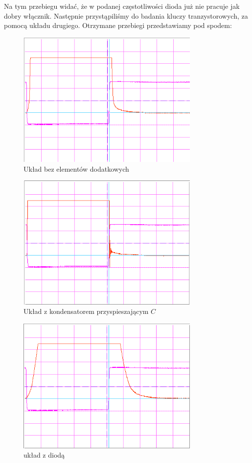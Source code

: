 \documentclass[a4paper,11pt]{article}
\begin{document}
Na tym przebiegu widać, że w podanej częstotliwości dioda już nie pracuje jak dobry włącznik.
\newline
\newline
Następnie przystąpiliśmy do badania kluczy tranzystorowych, za pomocą układu drugiego. 
Otrzymane przebiegi przedstawiamy pod spodem: 
\begin{figure} [H]
  \begin{center}
    \includegraphics[width = 9cm]{../Obrazki_i_tekst/obrobione/II1ciety.png}
    \caption{Układ bez elementów dodatkowych }
  \end{center}
\end{figure}
\begin{figure} [H]
  \begin{center}
    \includegraphics[width = 9cm]{../Obrazki_i_tekst/obrobione/II1zkondecprzyspciety.png}
    \caption{Układ z kondensatorem przyspieszającym $C$}
  \end{center}
\end{figure}
\begin{figure} [H]
  \begin{center}
    \includegraphics[width = 9cm]{../Obrazki_i_tekst/obrobione/II1zdiodasciety.png}
    \caption{układ z diodą}
  \end{center}
\end{figure}
\end{document}
